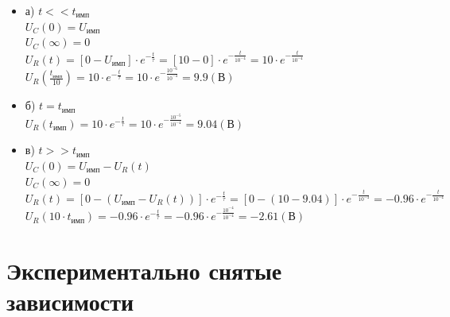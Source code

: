 \begin{itemize}
\begin{itemize}
\item[] а) $t << t_\text{имп}$\\

		$U_C(0)	= U_\text{имп}$\\
		$U_C(\infty) = 0$\\		
		
		$U_R(t) = [0 - U_\text{имп}] \cdot e^{-\frac{t}{\tau}} = [10 - 0] \cdot e^{-\frac{t}{10^{-4}}} = 10 \cdot e^{-\frac{t}{10^{-4}}}$\\

		$U_R(\frac{t_\text{имп}}{10}) = 10 \cdot e^{-\frac{t}{\tau}} = 10 \cdot e^{-\frac{10^{-6}}{10^{-4}}} = 9.9 (\text{В})$\\

\item[] б) $t = t_\text{имп}$\\

		$U_R(t_\text{имп}) = 10 \cdot e^{-\frac{t}{\tau}} = 10 \cdot e^{-\frac{10^{-5}}{10^{-4}}} = 9.04 (\text{В})$\\
	
\item[] в) $t >> t_\text{имп}$\\

		$U_C(0)	= U_\text{имп} - U_R(t)$\\
		$U_C(\infty) = 0$\\

		$U_R(t) = [0 - (U_\text{имп} - U_R(t))] \cdot e^{-\frac{t}{\tau}} = [0 - (10 - 9.04)] \cdot e^{-\frac{t}{10^{-4}}} = -0.96 \cdot e^{-\frac{t}{10^{-4}}}$\\

		$U_R(10 \cdot t_\text{имп}) = -0.96 \cdot e^{-\frac{t}{\tau}} = -0.96 \cdot e^{-\frac{10^{-4}}{10^{-4}}} = -2.61 (\text{В})$\\

\end{itemize}
\end{itemize}

\section{Экспериментально снятые зависимости}

